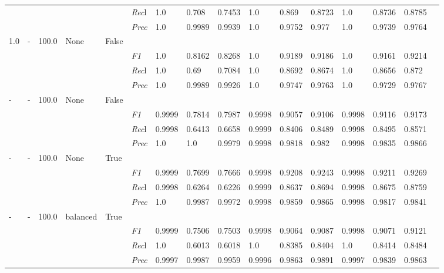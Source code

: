 \begin{table}[]
\begin{tabularx}{\textwidth}{XXXXX|X|XXX|XXX|XXXX}
& & & & & \textit{Rec}l & 1.0 & 0.708 & 0.7453    & 1.0 & 0.869    & 0.8723    & 1.0    & 0.8736    & 0.8785    \\
& & & & & \textit{Prec} & 1.0 & 0.9989 & 0.9939 & 1.0 & 0.9752 & 0.977 & 1.0 & 0.9739 & 0.9764 \\ \midrule
1.0 & - & 100.0 & None & False& & & & & & & & & \\
& & & & & \textit{F1} & 1.0 & 0.8162 & 0.8268 & 1.0 & 0.9189        & 0.9186        & 1.0        & 0.9161        & 0.9214        \\
& & & & & \textit{Rec}l & 1.0 & 0.69 & 0.7084    & 1.0 & 0.8692    & 0.8674    & 1.0    & 0.8656    & 0.872    \\
& & & & & \textit{Prec} & 1.0 & 0.9989 & 0.9926 & 1.0 & 0.9747 & 0.9763 & 1.0 & 0.9729 & 0.9767 \\ \midrule
- & - & 100.0 & None & False& & & & & & & & & \\
& & & & & \textit{F1} & 0.9999 & 0.7814 & 0.7987 & 0.9998 & 0.9057        & 0.9106        & 0.9998        & 0.9116        & 0.9173        \\
& & & & & \textit{Rec}l & 0.9998 & 0.6413 & 0.6658    & 0.9999 & 0.8406    & 0.8489    & 0.9998    & 0.8495    & 0.8571    \\
& & & & & \textit{Prec} & 1.0 & 1.0 & 0.9979 & 0.9998 & 0.9818 & 0.982 & 0.9998 & 0.9835 & 0.9866 \\ \midrule
- & - & 100.0 & None & True& & & & & & & & & \\
& & & & & \textit{F1} & 0.9999 & 0.7699 & 0.7666 & 0.9998 & 0.9208        & 0.9243        & 0.9998        & 0.9211        & 0.9269        \\
& & & & & \textit{Rec}l & 0.9998 & 0.6264 & 0.6226    & 0.9999 & 0.8637    & 0.8694    & 0.9998    & 0.8675    & 0.8759    \\
& & & & & \textit{Prec} & 1.0 & 0.9987 & 0.9972 & 0.9998 & 0.9859 & 0.9865 & 0.9998 & 0.9817 & 0.9841 \\ \midrule
- & - & 100.0 & balanced & True& & & & & & & & & \\
& & & & & \textit{F1} & 0.9999 & 0.7506 & 0.7503 & 0.9998 & 0.9064        & 0.9087        & 0.9998        & 0.9071        & 0.9121        \\
& & & & & \textit{Rec}l & 1.0 & 0.6013 & 0.6018    & 1.0 & 0.8385    & 0.8404    & 1.0    & 0.8414    & 0.8484    \\
& & & & & \textit{Prec} & 0.9997 & 0.9987 & 0.9959 & 0.9996 & 0.9863 & 0.9891 & 0.9997 & 0.9839 & 0.9863 \\ \midrule

\end{tabularx}
\end{table}
